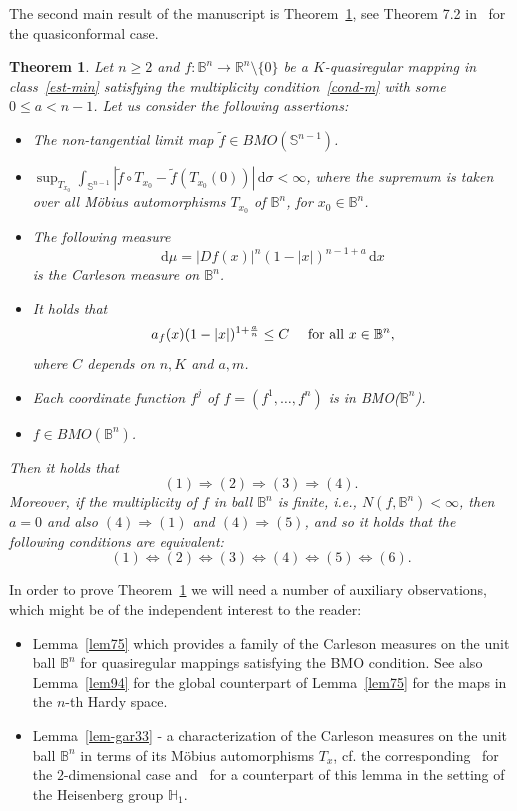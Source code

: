 \documentclass[11pt,a4paper,reqno]{amsart}
\newtheorem{theorem}{Theorem}[section]
\theoremstyle{definition}
\newcommand{\B}{\mathbb{B}^n}
\newcommand{\Rn}{{\mathbb R}^n}
\newcommand{\ud}{\mathrm {d}}
\newcommand{\Sn}{\mathbb{S}^{n-1}}
\numberwithin{komcounter}{section}
\begin{document}
The second main result of the manuscript is Theorem~\ref{thm72}, see Theorem 7.2 in~\cite{ak} for the quasiconformal case.

\begin{theorem}\label{thm72}
  Let $n \geq 2$ and $f:\B\to \Rn \setminus \{0\}$ be a $K$-quasiregular mapping in class~\eqref{est-min} satisfying the multiplicity condition~\eqref{cond-m} with some $0\leq a<n-1$. Let us consider the following assertions:
  \begin{itemize}
   \item[(1)] The non-tangential limit map $\tilde{f}\in BMO(\Sn)$.
   \item[(2)] $\sup_{T_{x_0}} \int_{\Sn} |\tilde{f}\circ T_{x_0}- \tilde{f}(T_{x_0}(0))|\,\ud\sigma<\infty$, where the supremum is taken over all M\"obius automorphisms $T_{x_0}$ of $\B$, for $x_0\in \B$.
   \item[(3)] The following measure 
   \[
   \ud \mu= |Df(x)|^{n}(1-|x|)^{n-1+a}\,\ud x
   \] is the Carleson measure on $\B$.
   \item[(4)] It holds that 
   \[
   a_f(x)(1-|x|)^{1+\frac{a}{n}}\leq C\quad \hbox{ for all }x\in \B,
   \]
   where $C$ depends on $n, K$ and $a, m$. 
   \item[(5)] Each coordinate function $f^j$ of $f=(f^1,\ldots, f^n)$ is in BMO($\B$).
   \item[(6)] $f\in BMO(\B)$.
  \end{itemize}
  Then it holds that
  \[
   (1) \Rightarrow (2) \Rightarrow (3) \Rightarrow (4).
  \]
  Moreover, if the multiplicity of $f$ in ball $\B$ is finite, i.e., $N(f,\B)<\infty$, then $a=0$ and also $(4)\Rightarrow (1)$ and $(4)\Rightarrow (5)$, and so it holds that the following conditions are equivalent:
\[
(1) \Leftrightarrow (2) \Leftrightarrow (3) \Leftrightarrow (4) \Leftrightarrow (5) \Leftrightarrow (6).
\]
  \end{theorem}
 In order to prove Theorem~\ref{thm72} we will need a number of auxiliary observations, which might be of the independent interest to the reader:
\begin{itemize}
\item Lemma~\ref{lem75} which provides a family of the Carleson measures on the unit ball $\B$ for quasiregular mappings satisfying the BMO condition. See also Lemma~\ref{lem94} for the global counterpart of Lemma~\ref{lem75} for the maps in the $n$-th Hardy space.
\item Lemma~\ref{lem-gar33} - a characterization of the Carleson measures on the unit ball $\B$ in terms of its M\"obius automorphisms $T_x$, cf. the corresponding~\cite[Lemma 3.3, Ch VI]{g} for the $2$-dimensional case and~\cite[Theorem 1.2]{adgr} for a counterpart of this lemma in the setting of the Heisenberg group $\mathbb{H}_1$.
\end{itemize}
\end{document}
